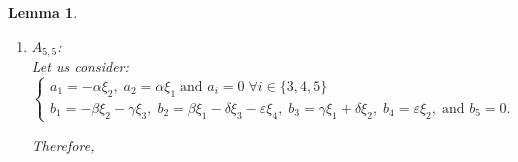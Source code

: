 \documentclass[10pt]{article}
\newtheorem{Lemma}{Lemma}
\begin{document}
\begin{Lemma}
\begin{enumerate}
\begin{equation}(\mathscr{L}_\xi\nabla) (v_3,v_5)=\tfrac{1}{2}\Big(-\varepsilon b_3v_1+(\delta a_1+\sigma a_2)v_3+(\delta b_1 +\sigma b_2)v_4+(\delta c_1+\sigma c_2)v_5\Big).\end{equation}
\begin{equation}(\mathscr{L}_\xi\nabla) (v_4,v_4)=-\varepsilon c_4 v_1.\label{A564}\end{equation}
\begin{equation}(\mathscr{L}_\xi\nabla) (v_4,v_5)=\tfrac{1}{2}\Big(\varepsilon a_1 v_3 + \varepsilon b_1 v_4 +\varepsilon c_1 v_5\Big).\end{equation}
\begin{equation}(\mathscr{L}_\xi\nabla) (v_5,v_5)=0.\label{A565}
\end{equation}

  \item \(A_{5,5}\):\\
  
 Let us consider:
\[\begin{cases} 
a_1=-\alpha\xi_2,\; 
a_2=\alpha\xi_1\; \text{and $a_i=0$}\; \forall i\in \{3,4,5\}\\ 
b_1=-\beta\xi_2 - \gamma\xi_3,\; 
b_2= \beta\xi_1 - \delta\xi_3 - \varepsilon\xi_4, \; b_3=\gamma\xi_1 + \delta\xi_2,\; b_4=\varepsilon\xi_2,\; \text{and $b_5=0$}.
\end{cases}\]

Therefore,


\end{enumerate}
\end{Lemma}
\end{document}

